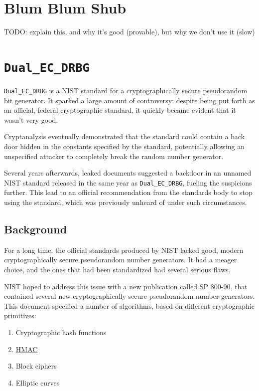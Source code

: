 \documentclass[11pt,ebook,table,dvipsnames]{memoir}
\begin{document}
\section{Blum Blum Shub}
\label{sec-2-10-4}

TODO: explain this, and why it's good (provable), but why we don't use
it (slow)
\section{\texttt{Dual\_EC\_DRBG}}
\label{sec-2-10-5}

\texttt{Dual\_EC\_DRBG} is a NIST standard for a cryptographically secure
pseudorandom bit generator. It sparked a large amount of controversy:
despite being put forth as an official, federal cryptographic
standard, it quickly became evident that it wasn't very good.

Cryptanalysis eventually demonstrated that the standard could contain
a back door hidden in the constants specified by the standard,
potentially allowing an unspecified attacker to completely break the
random number generator.

Several years afterwards, leaked documents suggested a backdoor in an
unnamed NIST standard released in the same year as \verb~Dual_EC_DRBG~,
fueling the suspicions further. This lead to an official
recommendation from the standards body to stop using the standard,
which was previously unheard of under such circumstances.

\subsection{Background}
\label{sec-2-10-5-1}

For a long time, the official standards produced by NIST lacked good,
modern cryptographically secure pseudorandom number generators. It had
a meager choice, and the ones that had been standardized had several
serious flaws.

NIST hoped to address this issue with a new publication called SP
800-90, that contained several new cryptographically secure
pseudorandom number generators. This document specified a number of
algorithms, based on different cryptographic primitives:

\begin{enumerate}
\item Cryptographic hash functions
\item \hyperref[HMAC]{HMAC}
\item Block ciphers
\item Elliptic curves
\end{enumerate}
\end{document}
